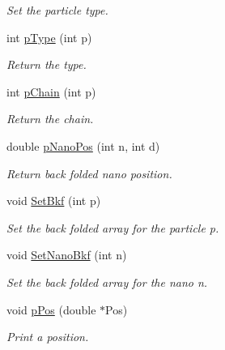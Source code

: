 \begin{DoxyCompactItemize}
\begin{DoxyCompactList}\small\item\em \-Set the particle type. \end{DoxyCompactList}\item 
\hypertarget{classVarData_a75896c37dd78ba0d2da013ad4cf0e87c}{int \hyperlink{classVarData_a75896c37dd78ba0d2da013ad4cf0e87c}{p\-Type} (int p)}\label{classVarData_a75896c37dd78ba0d2da013ad4cf0e87c}

\begin{DoxyCompactList}\small\item\em \-Return the type. \end{DoxyCompactList}\item 
\hypertarget{classVarData_ab7c7c0a0081da25f3d4624ae61dc9d68}{int \hyperlink{classVarData_ab7c7c0a0081da25f3d4624ae61dc9d68}{p\-Chain} (int p)}\label{classVarData_ab7c7c0a0081da25f3d4624ae61dc9d68}

\begin{DoxyCompactList}\small\item\em \-Return the chain. \end{DoxyCompactList}\item 
\hypertarget{classVarData_a0f556f4717568ddf4b1a4b2111b8d8f3}{double \hyperlink{classVarData_a0f556f4717568ddf4b1a4b2111b8d8f3}{p\-Nano\-Pos} (int n, int d)}\label{classVarData_a0f556f4717568ddf4b1a4b2111b8d8f3}

\begin{DoxyCompactList}\small\item\em \-Return back folded nano position. \end{DoxyCompactList}\item 
\hypertarget{classVarData_a7994a751e400e4df33a6a6fb8a8ba025}{void \hyperlink{classVarData_a7994a751e400e4df33a6a6fb8a8ba025}{\-Set\-Bkf} (int p)}\label{classVarData_a7994a751e400e4df33a6a6fb8a8ba025}

\begin{DoxyCompactList}\small\item\em \-Set the back folded array for the particle p. \end{DoxyCompactList}\item 
\hypertarget{classVarData_ae93d1705bac1b8fafb6feab474ac8f46}{void \hyperlink{classVarData_ae93d1705bac1b8fafb6feab474ac8f46}{\-Set\-Nano\-Bkf} (int n)}\label{classVarData_ae93d1705bac1b8fafb6feab474ac8f46}

\begin{DoxyCompactList}\small\item\em \-Set the back folded array for the nano n. \end{DoxyCompactList}\item 
\hypertarget{classVarData_a08e1dc218828fb8e3b3c9c02fccd6950}{void \hyperlink{classVarData_a08e1dc218828fb8e3b3c9c02fccd6950}{p\-Pos} (double $\ast$\-Pos)}\label{classVarData_a08e1dc218828fb8e3b3c9c02fccd6950}

\begin{DoxyCompactList}\small\item\em \-Print a position. \end{DoxyCompactList}\end{DoxyCompactItemize}
